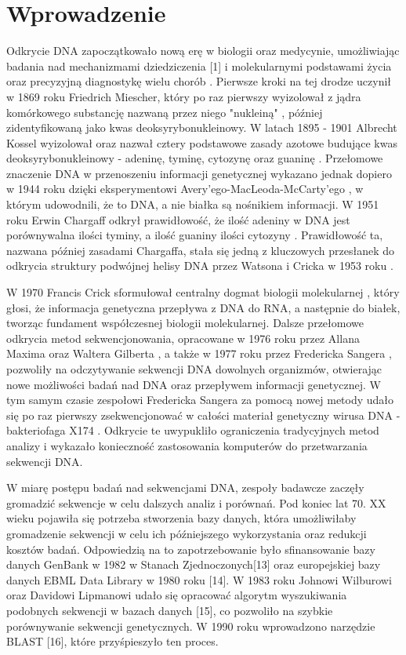 \clearpage
\section{Wprowadzenie}

Odkrycie DNA zapoczątkowało nową erę w biologii oraz medycynie, umożliwiając badania
nad mechanizmami dziedziczenia [1] i molekularnymi podstawami życia oraz precyzyjną 
diagnostykę wielu chorób \cite{Louie:2000}. Pierwsze kroki na tej drodze uczynił w 1869 roku 
Friedrich Miescher, który po raz pierwszy wyizolował z jądra komórkowego substancję 
nazwaną przez niego "nukleiną" \cite{Dahm:2005}, później zidentyfikowaną jako kwas deoksyrybonukleinowy. 
W latach 1895 - 1901 Albrecht Kossel wyizolował oraz nazwał cztery podstawowe zasady 
azotowe budujące kwas deoksyrybonukleinowy - adeninę, tyminę, cytozynę oraz guaninę \cite{Kossel:1893}.
Przełomowe znaczenie DNA w przenoszeniu informacji genetycznej wykazano jednak dopiero 
w 1944 roku dzięki eksperymentowi Avery'ego-MacLeoda-McCarty'ego \cite{Avery:1944}, w którym udowodnili, 
że to DNA, a nie białka są nośnikiem informacji. 
W 1951 roku Erwin Chargaff odkrył prawidłowość, że ilość adeniny w DNA jest porównywalna
ilości tyminy, a ilość guaniny ilości cytozyny \cite{Chargaff:1952}. Prawidłowość ta, nazwana później zasadami
Chargaffa, stała się jedną z kluczowych przesłanek do odkrycia struktury podwójnej helisy 
DNA przez Watsona i Cricka w 1953 roku \cite{Watson:1953}.

W 1970 Francis Crick sformułował centralny dogmat biologii molekularnej \cite{Crick:1970}, który głosi,
że informacja genetyczna przepływa z DNA do RNA, a następnie do białek, tworząc 
fundament współczesnej biologii molekularnej. Dalsze przełomowe odkrycia metod sekwencjonowania,
opracowane w 1976 roku przez Allana Maxima oraz Waltera Gilberta \cite{Maxam:1977}, a także w 1977 roku 
przez Fredericka Sangera \cite{Sanger:1977}, pozwoliły na odczytywanie sekwencji DNA dowolnych organizmów, 
otwierając nowe możliwości badań nad DNA oraz przepływem informacji genetycznej. 
W tym samym czasie zespołowi Fredericka Sangera za pomocą nowej metody udało się 
po raz pierwszy zsekwencjonować w całości materiał genetyczny wirusa DNA - 
bakteriofaga  X174 \cite{Sanger:1977_2}. Odkrycie te uwypukliło ograniczenia tradycyjnych metod  %
analizy i wykazało konieczność zastosowania komputerów do przetwarzania sekwencji DNA. \cite{Staden:197 9}

W miarę postępu badań nad sekwencjami DNA, zespoły badawcze zaczęły gromadzić sekwencje 
w celu dalszych analiz i porównań. Pod koniec lat 70. XX wieku pojawiła się potrzeba 
stworzenia bazy danych, która umożliwiłaby gromadzenie sekwencji w celu ich późniejszego 
wykorzystania oraz redukcji kosztów badań. Odpowiedzią na to zapotrzebowanie było 
sfinansowanie bazy danych GenBank w 1982 w Stanach Zjednoczonych[13] oraz 
europejskiej bazy danych EBML Data Library w 1980 roku [14]. W 1983 roku 
Johnowi Wilburowi oraz Davidowi Lipmanowi udało się opracować algorytm wyszukiwania
podobnych sekwencji w bazach danych [15], co pozwoliło na szybkie porównywanie sekwencji 
genetycznych. W 1990 roku wprowadzono narzędzie BLAST [16], które przyśpieszyło ten 
proces.

